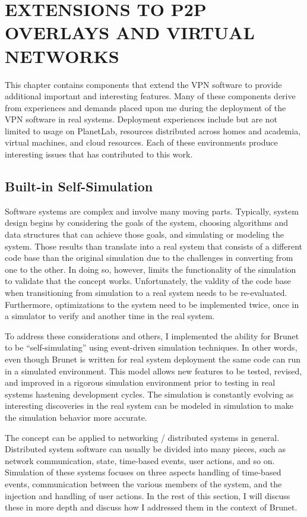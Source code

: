 \chapter{EXTENSIONS TO P2P OVERLAYS AND VIRTUAL NETWORKS}
\label{chap:extensions}

This chapter contains components that extend the VPN software to provide
additional important and interesting features.  Many of these components derive
from experiences and demands placed upon me during the deployment of the VPN
software in real systems.  Deployment experiences include but are not limited
to usage on PlanetLab, resources distributed across homes and academia, virtual
machines, and cloud resources.  Each of these environments produce interesting
issues that has contributed to this work.

\section{Built-in Self-Simulation}

Software systems are complex and involve many moving parts.  Typically, system
design begins by considering the goals of the system, choosing algorithms and
data structures that can achieve those goals, and simulating or modeling the
system.  Those results than translate into a real system that consists of a
different code base than the original simulation due to the challenges in
converting from one to the other.  In doing so, however, limits the
functionality of the simulation to validate that the concept works.
Unfortunately, the valdity of the code base when transitioning from simulation
to a real system needs to be re-evaluated.  Furthermore, optimizations to the
system need to be implemented twice, once in a simulator to verify and another
time in the real system.

To address these considerations and others, I implemented the ability for
Brunet to be ``self-simulating'' using event-driven simulation techniques. In
other words, even though Brunet is written for real system deployment the same
code can run in a simulated environment.  This model allows new features to be
tested, revised, and improved in a rigorous simulation environment prior to
testing in real systems hastening development cycles.  The simulation is
constantly evolving as interesting discoveries in the real system can be
modeled in simulation to make the simulation behavior more accurate.

The concept can be applied to networking / distributed systems in general.
Distributed system software can usually be divided into many pieces, such as
network communication, state, time-based events, user actions, and so on.
Simulation of these systems focuses on three aspects handling of time-based
events, communication between the various members of the system, and the
injection and handling of user actions.  In the rest of this section, I will
discuss these in more depth and discuss how I addressed them in the context of
Brunet.

